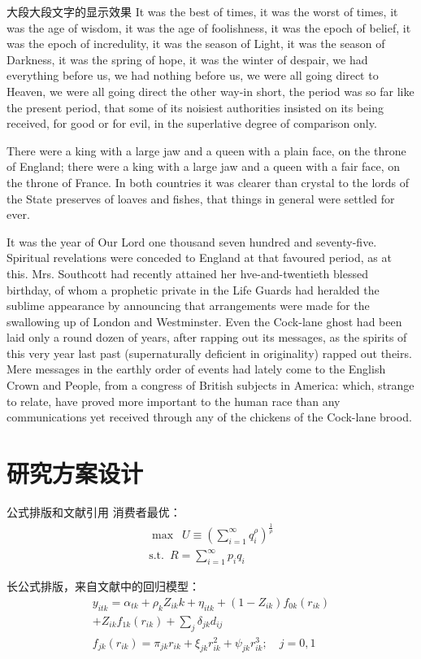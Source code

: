 \documentclass[xcolor=table,mathserif]{beamer}
\begin{document}
\begin{frame}[allowframebreaks]{大段大段文字的显示效果}
It was the best of times, it was the worst of times, it was the age of wisdom, it was the age of foolishness, it was the epoch of belief, it was the epoch of incredulity, it was the season of Light, it was the season of Darkness, it was the spring of hope, it was the winter of despair, we had everything before us, we had nothing before us, we were all going direct to Heaven, we were all going direct the other way-in short, the period was so far like the present period, that some of its noisiest authorities insisted on its being received, for good or for evil, in the superlative degree of comparison only. 

There were a king with a large jaw and a queen with a plain face, on the throne of England; there were a king with a large jaw and a queen with a fair face, on the throne of France. In both countries it was clearer than crystal to the lords of the State preserves of loaves and fishes, that things in general were settled for ever.

It was the year of Our Lord one thousand seven hundred and seventy-five. Spiritual revelations were conceded to England at that favoured period, as at this. Mrs. Southcott had recently attained her hve-and-twentieth blessed birthday, of whom a prophetic private in the Life Guards had heralded the sublime appearance by announcing that arrangements were made for the swallowing up of London and Westminster. Even the Cock-lane ghost had been laid only a round dozen of years, after rapping out its messages, as the spirits of this very year last past (supernaturally deficient in originality) rapped out theirs. Mere messages in the earthly order of events had lately come to the English Crown and People, from a congress of British subjects in America: which, strange to relate, have proved more important to the human race than any communications yet received through any of the chickens of the Cock-lane brood.
\end{frame}

\section{研究方案设计}
\begin{frame}{公式排版和文献引用}
    消费者最优：
    \begin{gather*}
        \max\enspace U\equiv \left(\sum_{i=1}^{\infty} q_i^\rho\right) ^{\frac{1}{\rho}}\\
        \mathrm{s.t.\enspace} R=\sum_{i=1}^{\infty} p_iq_i
    \end{gather*}

    长公式排版，来自文献中的回归模型\cite{Article2014}：
    \begin{gather*}
        y_{itk}=\alpha_{tk}+\rho_kZ_{ik}k+\eta_{itk}+(1-Z_{ik})f_{0k}(r_{ik})\\
        +Z_{ik}f_{1k}(r_{ik})+\sum_{j}\delta_{jk}d_{ij}\\
        f_{jk}(r_{ik})=\pi_{jk}r_{ik}+\xi _{jk}r_{ik}^{2}+\psi_{jk}r_{ik}^{3};\quad j=0,1
    \end{gather*}
\end{frame}
\end{document}
